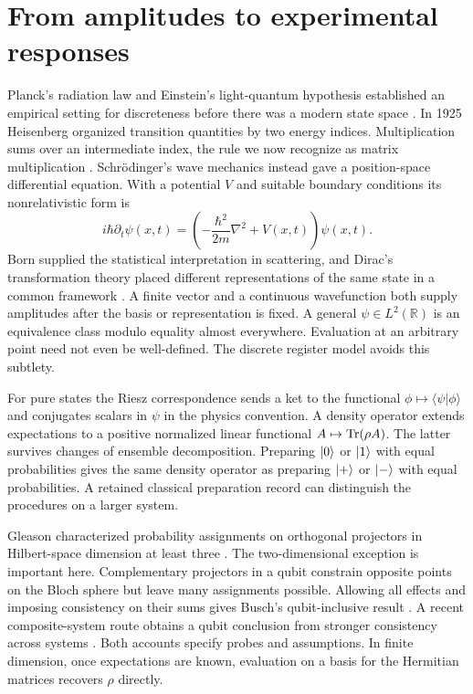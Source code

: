 \section{From amplitudes to experimental responses}
Planck's radiation law and Einstein's light-quantum hypothesis established an empirical setting for discreteness before there was a modern state space \cite{planck,einstein}. In 1925 Heisenberg organized transition quantities by two energy indices. Multiplication sums over an intermediate index, the rule we now recognize as matrix multiplication \cite{heisenberg}. Schr\"odinger's wave mechanics instead gave a position-space differential equation. With a potential $V$ and suitable boundary conditions its nonrelativistic form is
\[
 i\hbar \partial_t\psi(x,t)=
 \left(-\frac{\hbar^2}{2m}\nabla^2+V(x,t)\right)\psi(x,t).
\]
Born supplied the statistical interpretation in scattering, and Dirac's transformation theory placed different representations of the same state in a common framework \cite{schrodinger,born,dirac}. A finite vector and a continuous wavefunction both supply amplitudes after the basis or representation is fixed. A general $\psi\in L^2(\mathbb R)$ is an equivalence class modulo equality almost everywhere. Evaluation at an arbitrary point need not even be well-defined. The discrete register model avoids this subtlety.

For pure states the Riesz correspondence sends a ket to the functional $\phi\mapsto\langle\psi|\phi\rangle$ and conjugates scalars in $\psi$ in the physics convention. A density operator extends expectations to a positive normalized linear functional $A\mapsto\operatorname{Tr}(\rho A)$. The latter survives changes of ensemble decomposition. Preparing $\lvert 0\rangle$ or $\lvert 1\rangle$ with equal probabilities gives the same density operator as preparing $\lvert +\rangle$ or $\lvert -\rangle$ with equal probabilities. A retained classical preparation record can distinguish the procedures on a larger system.

Gleason characterized probability assignments on orthogonal projectors in Hilbert-space dimension at least three \cite{gleason}. The two-dimensional exception is important here. Complementary projectors in a qubit constrain opposite points on the Bloch sphere but leave many assignments possible. Allowing all effects and imposing consistency on their sums gives Busch's qubit-inclusive result \cite{busch}. A recent composite-system route obtains a qubit conclusion from stronger consistency across systems \cite{qubitgleason}. Both accounts specify probes and assumptions. In finite dimension, once expectations are known, evaluation on a basis for the Hermitian matrices recovers $\rho$ directly.

